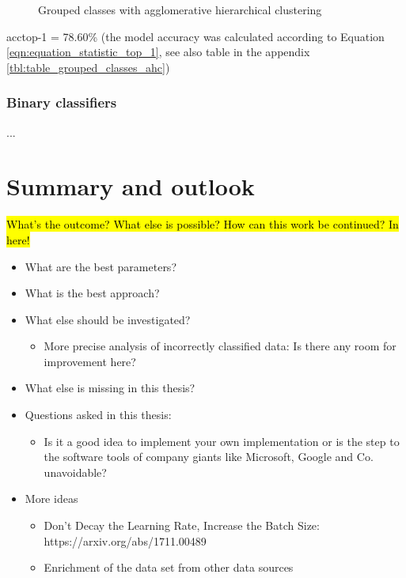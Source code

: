 \documentclass[10pt]{article}
\newcommand\inputpgf[2]{{
\let\pgfimageWithoutPath\pgfimage
\renewcommand{\pgfimage}[2][]{\pgfimageWithoutPath[##1]{#1/##2}}

}}
\newif\ifen
\newif\ifde
\newcommand{\en}[1]{\ifen#1\fi}
\newcommand{\de}[1]{\ifde#1\fi}
\begin{document}
						\begin{figure}[H]
							\begin{center}
								\scalebox{0.5}{
									\inputpgf{images/pgf}{pca-grouped-ahc.pgf}
								}
							\end{center}
							\caption{Grouped classes with agglomerative hierarchical clustering}
							\label{fig:analysis_grouped_classes_with_ahc}
						\end{figure}
						
						acctop-1 = 78.60\% (the model accuracy was calculated according to Equation \eqref{eqn:equation_statistic_top_1}, see also table in the appendix \ref{tbl:table_grouped_classes_ahc})
						
						\de{}
						\en{}
			
			\subsubsection{Binary classifiers}
				\noindent ...



	\pagebreak
	\section{Summary and outlook}
		\hl{What's the outcome? What else is possible? How can this work be continued? In here!}
		
		\begin{itemize}
			\setlength\itemsep{0em}
			\item What are the best parameters?
			\item What is the best approach?
			\item What else should be investigated?
			\begin{itemize}
				\setlength\itemsep{0em}
				\item More precise analysis of incorrectly classified data: Is there any room for improvement here?
			\end{itemize}
			\item What else is missing in this thesis?
			\item Questions asked in this thesis:
			\begin{itemize}
				\setlength\itemsep{0em}
				\item Is it a good idea to implement your own implementation or is the step to the software tools of company giants like Microsoft, Google and Co. unavoidable?
			\end{itemize}
			\item More ideas
			\begin{itemize}
				\setlength\itemsep{0em}
				\item Don't Decay the Learning Rate, Increase the Batch Size: https://arxiv.org/abs/1711.00489
				\item Enrichment of the data set from other data sources
			\end{itemize}
		\end{itemize}
		
\end{document}
